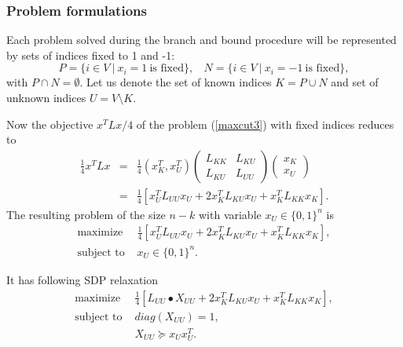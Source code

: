 \documentclass[12pt]{book}
\theoremstyle{definition}
\begin{document}
\subsubsection{Problem formulations}
Each problem solved during the branch and bound procedure will be represented by sets of indices fixed to 1 and -1:  
$$P = \{i\in V \ \vert \ x_i =1 \ \mbox{is fixed} \}, \ \ \ \
N = \{i\in V \ \vert \ x_i =-1 \  \mbox{is fixed} \}, $$
with $P\cap N = \emptyset.$ 
Let us denote the set of known indices $K = P\cup N$ and set of unknown indices $U = V\setminus K$. 


Now the objective $x^TLx/4$ of the problem (\ref{maxcut3}) with fixed indices reduces to 
\begin{eqnarray*}
\frac{1}{4}x^TLx &=& \frac{1}{4}(x_K^T , x_U^T )
\left(\begin{array}{rr} L_{KK} & L_{KU} \\ L_{KU} & L_{UU} \end{array}\right)\left(\begin{array}{c} x_K \\ x_U \end{array}\right) \\
&=& \frac{1}{4} \left[ x^T_UL_{UU}x_U +2x^T_KL_{KU}x_U + x^T_KL_{KK}x_K \right].
\end{eqnarray*}
The resulting problem of the size $n-k$ with variable $x_U\in\{0,1\}^n$ 
is 
\begin{equation*}
\begin{array}{ll}
\mbox{maximize } & \frac{1}{4} \left[ x^T_UL_{UU}x_U +2x^T_KL_{KU}x_U + x^T_KL_{KK}x_K \right], \\
\mbox{subject to } & x_U\in\{0,1\}^n.
\end{array}
\end{equation*}


It has following SDP relaxation 
\begin{equation*}
\begin{array}{ll}
\mbox{maximize } & \frac{1}{4} \left[ L_{UU}\bullet X_{UU} +2x^T_KL_{KU}x_U + x^T_KL_{KK}x_K \right], \\
\mbox{subject to } & diag(X_{UU}) = 1, \\
				& X_{UU}\succeq x_Ux_U^T.
\end{array}
\end{equation*}
\end{document}
